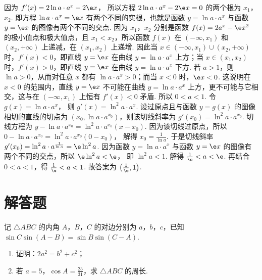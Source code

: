 \begin{solution}
因为
\(f'(x)=2\ln a\cdot a^x-2\e x\)，
所以方程
\(2\ln a\cdot a^x-2\e x=0\)
的两个根为 \(x_1\)，\(x_2\).
即方程
\(\ln a\cdot a^x=\e x\)
有两个不同的实根，也就是函数 \(y=\ln a\cdot a^x\) 与函数 \(y=\e x\) 的图像有两个不同的交点.
因为 \(x_1\)，\(x_2\) 分别是函数 \(f(x)=2a^x-\e x^2\) 的极小值点和极大值点，且 \(x_1<x_2\)，所以函数 \(f(x)\) 在 \((-\infty,x_1)\) 和 \((x_2,+\infty)\) 上递减，在 \((x_1,x_2)\) 上递增.
因此当 \(x\in (-\infty,x_1)\cup (x_2,+\infty)\) 时，\(f'(x)<0\)，即直线 \(y=\e x\) 在曲线 \(y=\ln a\cdot a^x\) 上方；当 \(x\in (x_1,x_2)\) 时，\(f'(x)>0\)，即直线 \(y=\e x\) 在曲线 \(y=\ln a\cdot a^x\) 下方.
若 \(a>1\)，则 \(\ln a>0\)，从而对任意 \(x\) 都有 \(\ln a\cdot a^x>0\)；而当 \(x<0\) 时，\(\e x<0\). 这说明在 \(x<0\) 的范围内，直线 \(y=\e x\) 不可能在曲线 \(y=\ln a\cdot a^x\) 上方，更不可能与它相交，这与在 \((-\infty,x_1)\) 上恒有 \(f'(x)<0\) 矛盾. 所以
\(0<a<1\).
令
\(g(x)=\ln a\cdot a^x\)，
则
\(g'(x)=\ln^2 a\cdot a^x\).
设过原点且与函数 \(y=g(x)\) 的图像相切的直线的切点为 \(\left( x_0,\ln a\cdot a^{x_0} \right)\)，则该切线斜率为
\(g'(x_0)=\ln^2 a\cdot a^{x_0}\).
切线方程为
\(y-\ln a\cdot a^{x_0}=\ln^2 a\cdot a^{x_0}\left( x-x_0 \right)\).
因为该切线过原点，所以
\(0-\ln a\cdot a^{x_0}=\ln^2 a\cdot a^{x_0}\left( 0-x_0 \right)\)，
解得
\(x_0=\frac{1}{\ln a}\).
于是切线斜率
\(g'(x_0)=\ln^2 a\cdot a^{\frac{1}{\ln a}}=\e \ln^2 a\).
因为函数 \(y=\ln a\cdot a^x\) 与函数 \(y=\e x\) 的图像有两个不同的交点，所以
\(\e \ln^2 a<\e\)，
即
\(\ln^2 a<1\).
解得
\(\frac{1}{\e}<a<\e\).
再结合 \(0<a<1\)，得
\(\frac{1}{\e}<a<1\).
故答案为 \(\left( \frac{1}{\e},1 \right)\).
\end{solution}
\section{解答题}

\begin{problem}
记 \(\triangle ABC\) 的内角 \(A\)，\(B\)，\(C\) 的对边分别为 \(a\)，\(b\)，\(c\)，已知 \(\sin C\sin \left( A-B \right)=\sin B\sin \left( C-A \right)\).
\begin{enumerate}
\item 证明：\(2a^2=b^2+c^2\)；
\item 若 \(a=5\)，\(\cos A=\frac{25}{31}\)，求 \(\triangle ABC\) 的周长.
\end{enumerate}
\end{problem}

